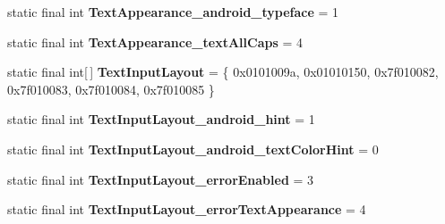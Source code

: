\begin{DoxyCompactItemize}
\item 
\hypertarget{classandroid_1_1support_1_1design_1_1_r_1_1styleable_aa5911a5763e1b03e8ea594230ad9f1a5}{}static final int {\bfseries Text\+Appearance\+\_\+android\+\_\+typeface} = 1\label{classandroid_1_1support_1_1design_1_1_r_1_1styleable_aa5911a5763e1b03e8ea594230ad9f1a5}

\item 
\hypertarget{classandroid_1_1support_1_1design_1_1_r_1_1styleable_a9222a2b9d5bbe0564ce516e6b451f89c}{}static final int {\bfseries Text\+Appearance\+\_\+text\+All\+Caps} = 4\label{classandroid_1_1support_1_1design_1_1_r_1_1styleable_a9222a2b9d5bbe0564ce516e6b451f89c}

\item 
\hypertarget{classandroid_1_1support_1_1design_1_1_r_1_1styleable_ae01fd2fce65dc8639f3898586b0cedcf}{}static final int\mbox{[}$\,$\mbox{]} {\bfseries Text\+Input\+Layout} = \{ 0x0101009a, 0x01010150, 0x7f010082, 0x7f010083, 0x7f010084, 0x7f010085 \}\label{classandroid_1_1support_1_1design_1_1_r_1_1styleable_ae01fd2fce65dc8639f3898586b0cedcf}

\item 
\hypertarget{classandroid_1_1support_1_1design_1_1_r_1_1styleable_acacd639ef9f0f53a5980cca280c4454d}{}static final int {\bfseries Text\+Input\+Layout\+\_\+android\+\_\+hint} = 1\label{classandroid_1_1support_1_1design_1_1_r_1_1styleable_acacd639ef9f0f53a5980cca280c4454d}

\item 
\hypertarget{classandroid_1_1support_1_1design_1_1_r_1_1styleable_ab77cba46b196f367d3323117ad3f3e37}{}static final int {\bfseries Text\+Input\+Layout\+\_\+android\+\_\+text\+Color\+Hint} = 0\label{classandroid_1_1support_1_1design_1_1_r_1_1styleable_ab77cba46b196f367d3323117ad3f3e37}

\item 
\hypertarget{classandroid_1_1support_1_1design_1_1_r_1_1styleable_ae2e5a1172c99efe3544ea5ffdaac92b6}{}static final int {\bfseries Text\+Input\+Layout\+\_\+error\+Enabled} = 3\label{classandroid_1_1support_1_1design_1_1_r_1_1styleable_ae2e5a1172c99efe3544ea5ffdaac92b6}

\item 
\hypertarget{classandroid_1_1support_1_1design_1_1_r_1_1styleable_a4d09e62deb1742d02e30465768411166}{}static final int {\bfseries Text\+Input\+Layout\+\_\+error\+Text\+Appearance} = 4\label{classandroid_1_1support_1_1design_1_1_r_1_1styleable_a4d09e62deb1742d02e30465768411166}


\end{DoxyCompactItemize}
